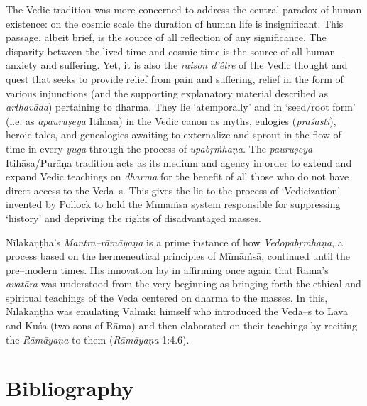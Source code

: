 The Vedic tradition was more concerned to address the central paradox of human existence: on the cosmic scale the duration of human life is insignificant. This passage, albeit brief, is the source of all reflection of any significance. The disparity between the lived time and cosmic time is the source of all human anxiety and suffering. Yet, it is also the \textit{raison d'être} of the Vedic thought and quest that seeks to provide relief from pain and suffering, relief in the form of various injunctions (and the supporting explanatory material described as \textit{arthavāda}) pertaining to dharma. They lie ‘atemporally’ and in ‘seed/root form’ (i.e. as \textit{apauruṣeya }Itihāsa) in the Vedic canon as myths, eulogies (\textit{praśasti}), heroic tales, and genealogies awaiting to externalize and sprout in the flow of time in every \textit{yuga} through the process of \textit{upabṛṁhaṇa.} The \textit{pauruṣeya} Itihāsa/Purāṇa tradition acts as its medium and agency in order to extend and expand Vedic teachings on \textit{dharma} for the benefit of all those who do not have direct access to the Veda–s. This gives the lie to the process of ‘Vedicization’ invented by Pollock to hold the Mīmāṁsā system responsible for suppressing ‘history’ and depriving the rights of disadvantaged masses.

Nīlakaṇṭha's \textit{Mantra–rāmāyaṇa} is a prime instance of how \textit{Vedopabṛṁ\-haṇa}, a process based on the hermeneutical principles of Mīmāṁsā, continued until the pre–modern times. His innovation lay in affirming once again that Rāma's \textit{avatāra} was understood from the very beginning as bringing forth the ethical and spiritual teachings of the Veda centered on dharma to the masses. In this, Nīlakaṇṭha was emulating Vālmīki himself who introduced the Veda–s to Lava and Kuśa (two sons of Rāma) and then elaborated on their teachings by reciting the \textit{Rāmāyaṇa} to them (\textit{Rāmāyaṇa} 1:4.6).


\section*{Bibliography}

